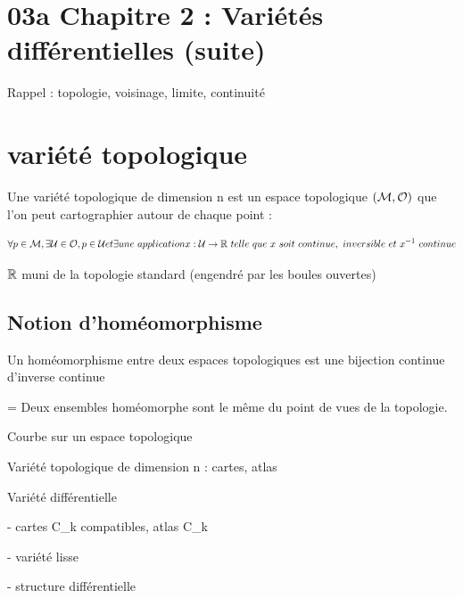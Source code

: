 \section{03a Chapitre 2 : Variétés différentielles (suite)}

Rappel : topologie, voisinage, limite, continuité
\section{variété topologique} %
Une variété topologique de dimension n est un espace topologique $(\mathcal{M},
\mathcal{O})$ que l'on peut cartographier autour de chaque point :

\[
\forall p \in \mc{M}, \exists \mc{U} \in \mc{O}, p \in \mc{U} et \exists une
\ application x : \mc{U} \to \mb{R}\ telle\ que\ x\ soit\ continue,\ inversible
\ et\ x^{-1}\ continue
\]

$\mathbb{R}$ muni de la topologie standard (engendré par les boules ouvertes)

\subsection{Notion d'homéomorphisme}
Un homéomorphisme entre deux espaces topologiques est une bijection continue
d'inverse continue

 =  Deux ensembles homéomorphe sont le même du point de vues de la topologie.

Courbe sur un espace topologique

Variété topologique de dimension n : cartes, atlas

Variété différentielle

- cartes C\_k compatibles, atlas C\_k

- variété lisse

- structure différentielle


